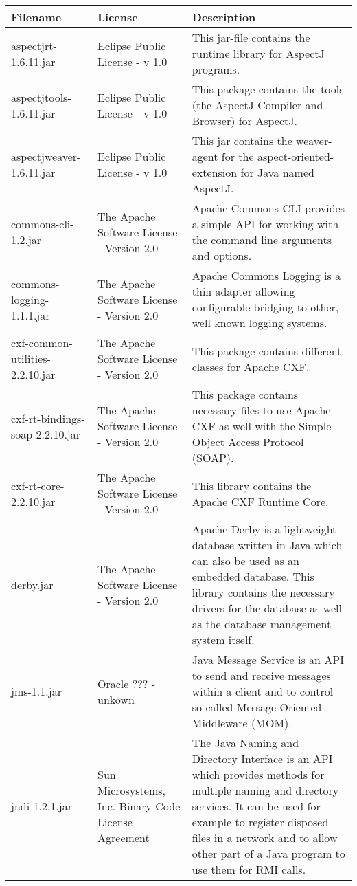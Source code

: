 \begin{center}
\begin{longtable}{|p{}|p{}|p{}|}
\hline 
Filename & License & Description\\
\hline
\hline 
aspectjrt-1.6.11.jar & Eclipse Public License - v 1.0 & This jar-file contains the runtime library for AspectJ programs.\\
\hline 
aspectjtools-1.6.11.jar & Eclipse Public License - v 1.0 & This package contains the tools (the AspectJ Compiler and Browser) for AspectJ.\\
\hline 
aspectjweaver-1.6.11.jar & Eclipse Public License - v 1.0 & This jar contains the weaver-agent for the aspect-oriented-extension for Java named AspectJ.\\
\hline 
commons-cli-1.2.jar & The Apache Software License - Version 2.0 & Apache Commons CLI provides a simple API for working with the command line arguments and options.\\
\hline 
commons-logging-1.1.1.jar & The Apache Software License - Version 2.0 & Apache Commons Logging is a thin adapter allowing configurable bridging to other, well known logging systems.\\
\hline 
cxf-common-utilities-2.2.10.jar & The Apache Software License - Version 2.0 & This package contains different classes for Apache CXF.\\
\hline 
cxf-rt-bindings-soap-2.2.10.jar & The Apache Software License - Version 2.0 & This package contains necessary files to use Apache CXF as well with the Simple Object Access Protocol (SOAP).\\
\hline 
cxf-rt-core-2.2.10.jar & The Apache Software License - Version 2.0 & This library contains the Apache CXF Runtime Core.\\
\hline 
derby.jar & The Apache Software License - Version 2.0 & Apache Derby is a lightweight database written in Java which can also be used as an embedded database. This library contains the necessary drivers for the database as well as the database management system itself.\\
\hline 
jms-1.1.jar & Oracle ??? - unkown & Java Message Service is an API to send and receive messages within a client and to control so called Message Oriented Middleware (MOM).\\
\hline 
jndi-1.2.1.jar & Sun Microsystems, Inc. Binary Code License Agreement & The Java Naming and Directory Interface is an API which provides methods for multiple naming and directory services. It can be used for example to register disposed files in a network and to allow other part of a Java program to use them for RMI calls.\\

\end{longtable}
\end{center}
